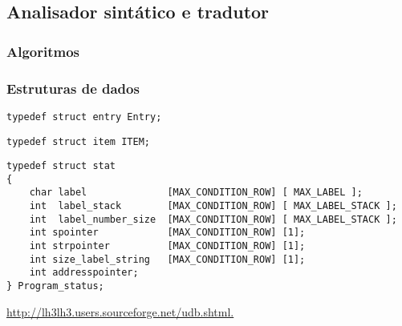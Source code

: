 \subsection{Analisador sintático e tradutor}
\label{subsec:sintatico:desenho}


\subsubsection{Algoritmos}
\label{subsec:subsubsection:algoritmos:desenho}


\subsubsection{Estruturas de dados}
\label{subsec:subsubsec:estruturas:desenho}

\begin{verbatim}
typedef struct entry Entry;
\end{verbatim}


\begin{verbatim}
typedef struct item ITEM;
\end{verbatim}


\begin{verbatim}
typedef struct stat
{
    char label              [MAX_CONDITION_ROW] [ MAX_LABEL ];
    int  label_stack        [MAX_CONDITION_ROW] [ MAX_LABEL_STACK ];
    int  label_number_size  [MAX_CONDITION_ROW] [ MAX_LABEL_STACK ];
    int spointer            [MAX_CONDITION_ROW] [1];
    int strpointer          [MAX_CONDITION_ROW] [1];
    int size_label_string   [MAX_CONDITION_ROW] [1];
    int addresspointer;
} Program_status;
\end{verbatim}

\url{http://lh3lh3.users.sourceforge.net/udb.shtml.}
